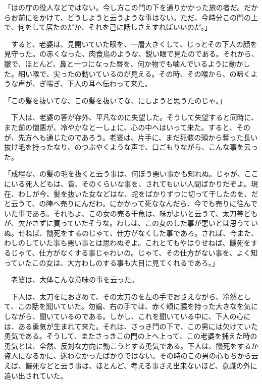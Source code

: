 \documentclass[a4j,twocolumn]{tarticle}
\begin{document}
「はの庁の役人などではない。今し方この門の下を通りかかった旅の者だ。だからお前にをかけて、どうしようと云うような事はない。ただ、今時分この門の上で、何をして居たのだか、それを己に話しさえすればいいのだ。」\par{}
　すると、老婆は、見開いていた眼を、一層大きくして、じっとその下人の顔を見守った。の赤くなった、肉食鳥のような、鋭い眼で見たのである。それから、皺で、ほとんど、鼻と一つになった唇を、何か物でも噛んでいるように動かした。細い喉で、尖ったの動いているのが見える。その時、その喉から、の啼くような声が、ぎ喘ぎ、下人の耳へ伝わって来た。\par{}
「この髪を抜いてな、この髪を抜いてな、にしようと思うたのじゃ。」\par{}
　下人は、老婆の答が存外、平凡なのに失望した。そうして失望すると同時に、また前の憎悪が、冷やかなと一しょに、心の中へはいって来た。すると、そのが、先方へも通じたのであろう。老婆は、片手に、まだ死骸の頭から奪った長い抜け毛を持ったなり、のつぶやくような声で、口ごもりながら、こんな事を云った。\par{}
「成程な、の髪の毛を抜くと云う事は、何ぼう悪い事かも知れぬ。じゃが、ここにいる死人どもは、皆、そのくらいな事を、されてもいい人間ばかりだぞよ。現在、わしが今、髪を抜いた女などはな、蛇をばかりずつに切って干したのを、だと云うて、の陣へ売りにんだわ。にかかって死ななんだら、今でも売りに往んでいた事であろ。それもよ、この女の売る干魚は、味がよいと云うて、太刀帯どもが、欠かさずに買っていたそうな。わしは、この女のした事が悪いとは思うていぬ。せねば、饑死をするのじゃて、仕方がなくした事であろ。されば、今また、わしのしていた事も悪い事とは思わぬぞよ。これとてもやはりせねば、饑死をするじゃて、仕方がなくする事じゃわいの。じゃて、その仕方がない事を、よく知っていたこの女は、大方わしのする事も大目に見てくれるであろ。」\par{}
　老婆は、大体こんな意味の事を云った。\par{}
　下人は、太刀をにおさめて、その太刀のを左の手でおさえながら、冷然として、この話を聞いていた。勿論、右の手では、赤く頬に膿を持った大きなを気にしながら、聞いているのである。しかし、これを聞いている中に、下人の心には、ある勇気が生まれて来た。それは、さっき門の下で、この男には欠けていた勇気である。そうして、またさっきこの門の上へ上って、この老婆を捕えた時の勇気とは、全然、反対な方向に動こうとする勇気である。下人は、饑死をするか盗人になるかに、迷わなかったばかりではない。その時のこの男の心もちから云えば、饑死などと云う事は、ほとんど、考える事さえ出来ないほど、意識の外に追い出されていた。\par{}
\end{document}
